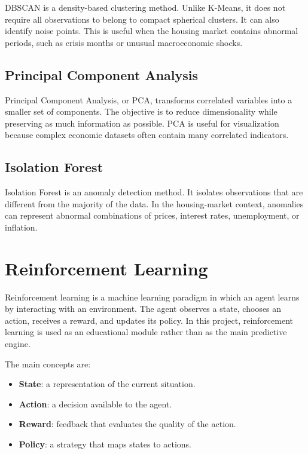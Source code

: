 DBSCAN is a density-based clustering method. Unlike K-Means, it does not require all observations to belong to compact spherical clusters. It can also identify noise points. This is useful when the housing market contains abnormal periods, such as crisis months or unusual macroeconomic shocks.

\subsection{Principal Component Analysis}

Principal Component Analysis, or PCA, transforms correlated variables into a smaller set of components. The objective is to reduce dimensionality while preserving as much information as possible. PCA is useful for visualization because complex economic datasets often contain many correlated indicators.

\subsection{Isolation Forest}

Isolation Forest is an anomaly detection method. It isolates observations that are different from the majority of the data. In the housing-market context, anomalies can represent abnormal combinations of prices, interest rates, unemployment, or inflation.

\section{Reinforcement Learning}

Reinforcement learning is a machine learning paradigm in which an agent learns by interacting with an environment. The agent observes a state, chooses an action, receives a reward, and updates its policy. In this project, reinforcement learning is used as an educational module rather than as the main predictive engine.

The main concepts are:
\begin{itemize}
\item \textbf{State}: a representation of the current situation.
\item \textbf{Action}: a decision available to the agent.
\item \textbf{Reward}: feedback that evaluates the quality of the action.
\item \textbf{Policy}: a strategy that maps states to actions.
\end{itemize}

